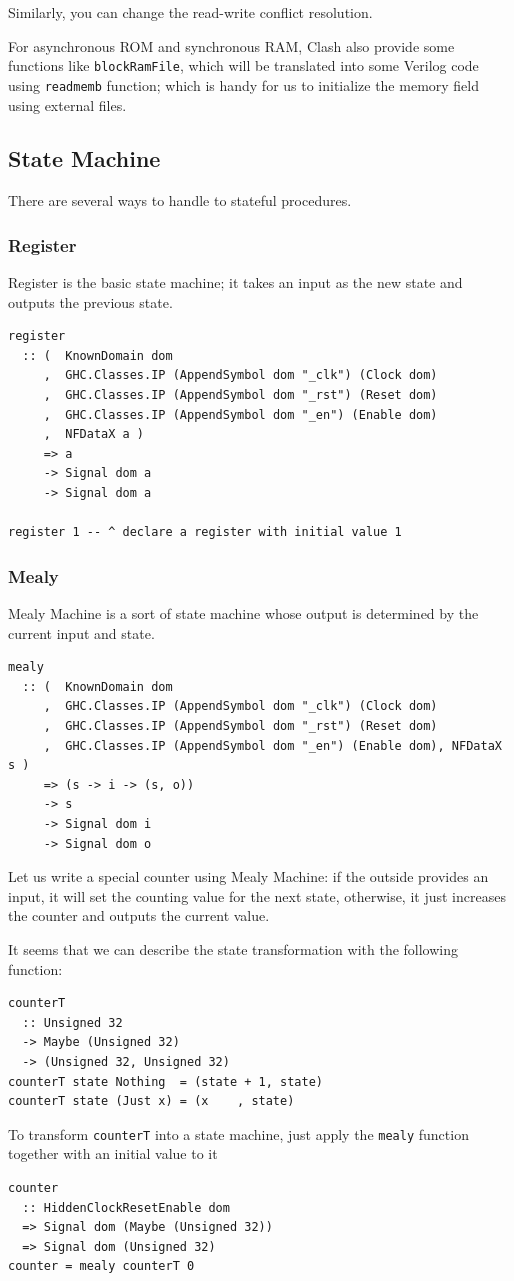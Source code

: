 \documentclass[a4paper,12pt, oneside]{book}
\begin{document}
Similarly, you can change the read-write conflict resolution. 

For asynchronous ROM and synchronous RAM, Clash also provide some functions like \texttt{blockRamFile}, which will be translated into some Verilog code using \texttt{readmemb} function; which is handy for us to initialize the memory field using external files.

\subsection{State Machine}
There are several ways to handle to stateful procedures.
\subsubsection{Register}
Register is the basic state machine; it takes an input as the new state and outputs the previous state.
\begin{verbatim}
register
  :: (  KnownDomain dom
     ,  GHC.Classes.IP (AppendSymbol dom "_clk") (Clock dom)
     ,  GHC.Classes.IP (AppendSymbol dom "_rst") (Reset dom)
     ,  GHC.Classes.IP (AppendSymbol dom "_en") (Enable dom)
     ,  NFDataX a ) 
     => a 
     -> Signal dom a 
     -> Signal dom a

register 1 -- ^ declare a register with initial value 1
\end{verbatim}
\subsubsection{Mealy}
Mealy Machine is a sort of state machine whose output is determined by the current input and state.
\begin{verbatim}
mealy
  :: (  KnownDomain dom
     ,  GHC.Classes.IP (AppendSymbol dom "_clk") (Clock dom)
     ,  GHC.Classes.IP (AppendSymbol dom "_rst") (Reset dom)
     ,  GHC.Classes.IP (AppendSymbol dom "_en") (Enable dom), NFDataX s ) 
     => (s -> i -> (s, o)) 
     -> s 
     -> Signal dom i 
     -> Signal dom o
\end{verbatim}
Let us write a special counter using Mealy Machine: if the outside provides an input, it will set the counting value for the next state, otherwise, it just increases the counter and outputs the current value.

It seems that we can describe the state transformation with the following function:
\begin{verbatim}
counterT 
  :: Unsigned 32 
  -> Maybe (Unsigned 32) 
  -> (Unsigned 32, Unsigned 32)
counterT state Nothing  = (state + 1, state)
counterT state (Just x) = (x    , state)
\end{verbatim}
To transform \texttt{counterT} into a state machine, just apply the \texttt{mealy} function together with an initial value to it
\begin{verbatim}
counter 
  :: HiddenClockResetEnable dom
  => Signal dom (Maybe (Unsigned 32))
  => Signal dom (Unsigned 32)
counter = mealy counterT 0
\end{verbatim}
\end{document}
